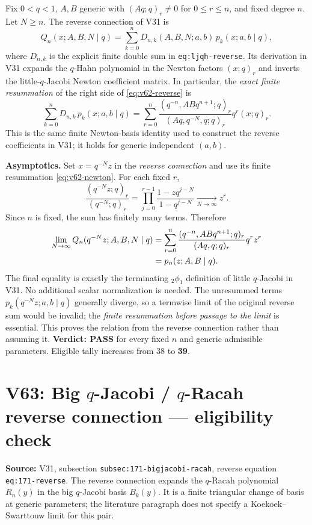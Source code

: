 \documentclass[11pt]{article}
\begin{document}
\noindent Fix $0<q<1$, $A,B$ generic with $(Aq;q)_r\ne0$ for
$0\le r\le n$, and fixed degree $n$. Let $N\ge n$. The reverse
connection of V31 is
\begin{equation}\label{eq:v62-reverse}
 Q_n(x;A,B,N\mid q)=\sum_{k=0}^n
 D_{n,k}(A,B,N;a,b)\,p_k(x;a,b\mid q),
\end{equation}
where $D_{n,k}$ is the explicit finite double sum in
\texttt{eq:ljqh-reverse}. Its derivation in V31 expands the $q$-Hahn
polynomial in the Newton factors $(x;q)_r$ and inverts the
little-$q$-Jacobi Newton coefficient matrix. In particular, the
\emph{exact finite resummation} of the right side of
\eqref{eq:v62-reverse} is
\begin{equation}\label{eq:v62-newton}
 \sum_{k=0}^n D_{n,k}\,p_k(x;a,b\mid q)
 =\sum_{r=0}^n
 \frac{(q^{-n},ABq^{n+1};q)_r}{(Aq,q^{-N},q;q)_r}
 q^r(x;q)_r.
\end{equation}
This is the same finite Newton-basis identity used to construct the
reverse coefficients in V31; it holds for generic independent $(a,b)$.

\noindent\textbf{Asymptotics.} Set $x=q^{-N}z$ in the \emph{reverse
connection} and use its finite resummation \eqref{eq:v62-newton}.
For each fixed $r$,
\begin{equation}\label{eq:v62-ratio}
 \frac{(q^{-N}z;q)_r}{(q^{-N};q)_r}
 =\prod_{j=0}^{r-1}\frac{1-zq^{j-N}}{1-q^{j-N}}
 \xrightarrow[N\to\infty]{}z^r.
\end{equation}
Since $n$ is fixed, the sum has finitely many terms. Therefore
\begin{align}\label{eq:v62-limit}
 \lim_{N\to\infty}Q_n(q^{-N}z;A,B,N\mid q)
 &=\sum_{r=0}^n\frac{(q^{-n},ABq^{n+1};q)_r}
 {(Aq,q;q)_r}q^rz^r\\
 &=p_n(z;A,B\mid q).\notag
\end{align}
The final equality is exactly the terminating ${}_2\phi_1$
definition of little $q$-Jacobi in V31. No additional scalar
normalization is needed. The unresummed terms
$p_k(q^{-N}z;a,b\mid q)$ generally diverge, so a termwise limit of
the original reverse sum would be invalid; the \emph{finite
resummation before passage to the limit} is essential. This proves
the relation from the reverse connection rather than assuming it.
\textbf{Verdict: PASS} for every fixed $n$ and generic admissible
parameters. Eligible tally increases from 38 to \textbf{39}.


\section{V63: Big $q$-Jacobi / $q$-Racah reverse connection --- eligibility check}
\noindent\textbf{Source:} V31, subsection \texttt{subsec:171-bigjacobi-racah}, reverse equation \texttt{eq:171-reverse}. The reverse connection expands the $q$-Racah polynomial $R_n(y)$ in the big $q$-Jacobi basis $B_k(y)$. It is a finite triangular change of basis at generic parameters; the literature paragraph does not specify a Koekoek--Swarttouw limit for this pair.
\end{document}
